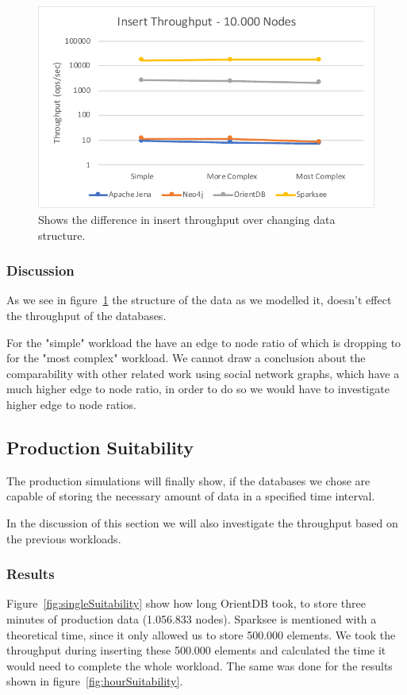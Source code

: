 \begin{figure}[h!]
  \centering
  \includegraphics[width=.5\textwidth]{images/production/structure}
  \caption{Shows the difference in insert throughput over changing data structure.}
  \label{fig:structure}
\end{figure}

\subsubsection{Discussion}
As we see in figure~\ref{fig:structure} the structure of the data as we modelled it,
doesn't effect the throughput of the databases.

For the "simple" workload the have an edge to node ratio of  which is dropping to  for the "most complex" workload.
We cannot draw a conclusion about the comparability with other related work using social network graphs,
which have a much higher edge to node ratio,
in order to do so we would have to investigate higher edge to node ratios.

\subsection{Production Suitability}
\label{ch:evaluation:se:productionSuitability}
The production simulations will finally show,
if the databases we chose are capable of storing the necessary amount of data in a specified time interval.

In the discussion of this section we will also investigate the throughput based on the previous workloads.

\subsubsection{Results}
Figure~\ref{fig:singleSuitability} show how long OrientDB took,
to store three minutes of production data (1.056.833 nodes).
Sparksee is mentioned with a theoretical time,
since it only allowed us to store 500.000 elements.
We took the throughput during inserting these 500.000 elements and calculated the time it would need to complete the whole workload.
The same was done for the results shown in figure~\ref{fig:hourSuitability}.

